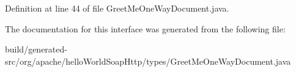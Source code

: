Definition at line 44 of file Greet\+Me\+One\+Way\+Document.\+java.



The documentation for this interface was generated from the following file\+:\begin{DoxyCompactItemize}
\item 
build/generated-\/src/org/apache/hello\+World\+Soap\+Http/types/Greet\+Me\+One\+Way\+Document.\+java\end{DoxyCompactItemize}
